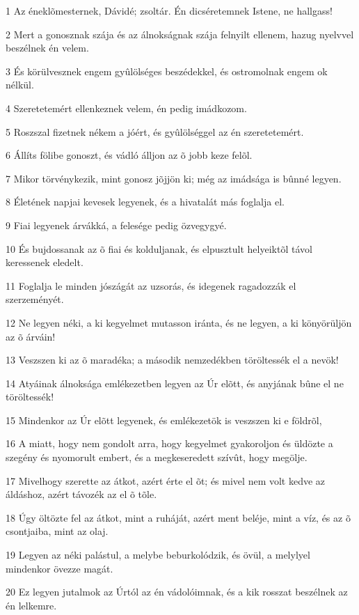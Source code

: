 \par 1 Az éneklõmesternek, Dávidé; zsoltár. Én dicséretemnek Istene, ne hallgass!
\par 2 Mert a gonosznak szája és az álnokságnak szája felnyilt ellenem, hazug nyelvvel beszélnek én velem.
\par 3 És körülvesznek engem gyûlölséges beszédekkel, és ostromolnak engem ok nélkül.
\par 4 Szeretetemért ellenkeznek velem, én pedig imádkozom.
\par 5 Roszszal fizetnek nékem a jóért, és gyûlölséggel az én szeretetemért.
\par 6 Állíts fölibe gonoszt, és vádló álljon az õ jobb keze felõl.
\par 7 Mikor törvénykezik, mint gonosz jõjjön ki; még az imádsága is bûnné legyen.
\par 8 Életének napjai kevesek legyenek, és a hivatalát más foglalja el.
\par 9 Fiai legyenek árvákká, a felesége pedig özvegygyé.
\par 10 És bujdossanak az õ fiai és kolduljanak, és elpusztult helyeiktõl távol keressenek eledelt.
\par 11 Foglalja le minden jószágát az uzsorás, és idegenek ragadozzák el szerzeményét.
\par 12 Ne legyen néki, a ki kegyelmet mutasson iránta, és ne legyen, a ki könyörüljön az õ árváin!
\par 13 Veszszen ki az õ maradéka; a második nemzedékben töröltessék el a nevök!
\par 14 Atyáinak álnoksága emlékezetben legyen az Úr elõtt, és anyjának bûne el ne töröltessék!
\par 15 Mindenkor az Úr elõtt legyenek, és emlékezetök is veszszen ki e földrõl,
\par 16 A miatt, hogy nem gondolt arra, hogy kegyelmet gyakoroljon és üldözte a szegény és nyomorult embert, és a megkeseredett szívût, hogy megölje.
\par 17 Mivelhogy szerette az átkot, azért érte el õt; és mivel nem volt kedve az áldáshoz, azért távozék az el õ tõle.
\par 18 Úgy öltözte fel az átkot, mint a ruháját, azért ment beléje, mint a víz, és az õ csontjaiba, mint az olaj.
\par 19 Legyen az néki palástul, a melybe beburkolódzik, és övül, a melylyel mindenkor övezze magát.
\par 20 Ez legyen jutalmok az Úrtól az én vádolóimnak, és a kik rosszat beszélnek az én lelkemre.
